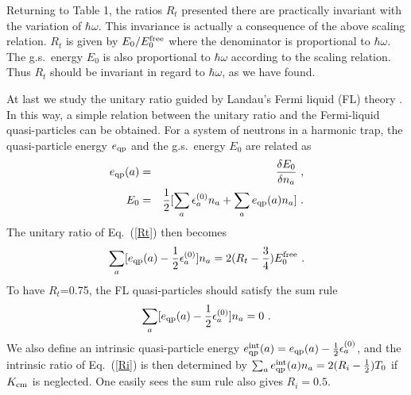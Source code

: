 \documentclass[twocolumn,preprintnumbers,superscriptaddress]{revtex4}
\begin{document}
Returning to Table 1, the ratios $R_t$
presented there are practically
invariant with the variation of $\hbar \omega$.
This invariance is actually
a consequence of the above scaling relation.
$R_t$ is given by $E_0/E_0^{\rm free}$
where the denominator is proportional to  $\hbar \omega$.
The g.s.~energy $E_0$
is also proportional to $\hbar\omega$ according to
the scaling relation. Thus $R_t$ should be invariant in regard to
$\hbar \omega$, as we have found.


At last we study the unitary ratio guided by Landau's Fermi liquid (FL) theory \cite{MBT}.
In this way, a simple relation between the unitary ratio
and the Fermi-liquid quasi-particles can be obtained.
For a system of neutrons in a harmonic trap, the quasi-particle
energy $e_{\rm qp}$ and the g.s.~energy $E_0$ are related as
\begin{eqnarray}
e_{\rm qp}(a) &=& \frac{\delta E_0}{\delta n_a}~, \nonumber \\
E_0 &=& \frac{1}{2}[\sum _a \epsilon_a ^{(0)}n_a + \sum _a e_{\rm qp}(a) n_a]~.
\end{eqnarray}
The unitary ratio of Eq.~(\ref{Rt}) then becomes
\begin{equation}
\sum _a [e_{\rm qp}(a)-\frac{1}{2}\epsilon _a ^{(0)} ]n_a
= 2(R_t-\frac{3}{4})E_0^{\rm free}~.
\end{equation}
To have $R_t$=0.75, the FL quasi-particles should satisfy the sum rule
\begin{equation}
\sum\limits_a [e_{\rm qp}(a)-\frac{1}{2}\epsilon _a^{(0)}] n_a = 0~. \label{sumrule}
\end{equation}
We also define an intrinsic quasi-particle energy $e^{\rm int}_{\rm qp}(a)=e_{\rm qp}(a)-\frac{1}{2}\epsilon _a^{(0)}$,
and the intrinsic ratio of Eq.~(\ref{Ri}) is then determined by $\sum _a e^{\rm int}_{\rm qp}(a) n_a = 2(R_i-\frac{1}{2})T_0$
if $K_{\rm cm}$ is neglected. One easily sees the sum rule also gives $R_i=0.5$.
\end{document}
